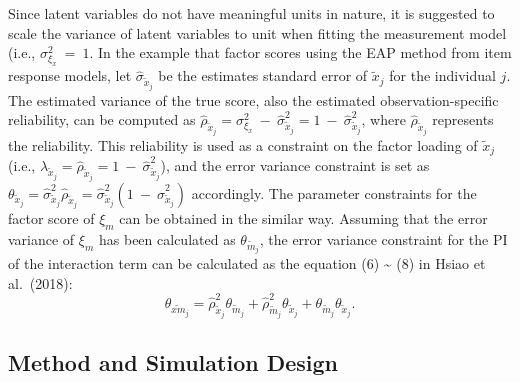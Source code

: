 \documentclass[
  11pt,
  man]{apa6}
\begin{document}
Since latent variables do not have meaningful units in nature, it is suggested to scale the variance of latent variables to unit when fitting the measurement model (i.e., \(\sigma_{\xi_{x}}^2 \ = \ 1\). In the example that factor scores using the EAP method from item response models, let \(\hat{\sigma}_{\tilde{x}_{j}}\) be the estimates standard error of \(\tilde{x}_{j}\) for the individual \(j\). The estimated variance of the true score, also the estimated observation-specific reliability, can be computed as \(\hat{\rho}_{\tilde{x}_{j}} = \sigma_{\xi_{x}}^2 \ - \ \hat{\sigma}_{\tilde{x}_{j}}^2 = 1 \ - \ \hat{\sigma}_{\tilde{x}_{j}}^2\), where \(\hat{\rho}_{\tilde{x}_{j}}\) represents the reliability. This reliability is used as a constraint on the factor loading of \(\tilde{x}_{j}\) (i.e., \(\lambda_{\tilde{x}_{j}} = \hat{\rho}_{\tilde{x}_{j}} = 1 \ - \ \hat{\sigma}_{\tilde{x}_{j}}^2\)), and the error variance constraint is set as \(\theta_{\tilde{x}_{j}} = \hat{\sigma}_{\tilde{x}_{j}}^2\hat{\rho}_{\tilde{x}_{j}} = \hat{\sigma}_{\tilde{x}_{j}}^2(1 \ - \ \hat{\sigma}_{\tilde{x}_{j}}^2)\) accordingly. The parameter constraints for the factor score of \(\xi_{m}\) can be obtained in the similar way. Assuming that the error variance of \(\xi_{m}\) has been calculated as \(\theta_{\tilde{m}_{j}}\), the error variance constraint for the PI of the interaction term can be calculated as the equation (6) \textasciitilde{} (8) in Hsiao et al.~(2018):
\begin{equation}
\theta_{\widetilde{xm}_{j}} =  \hat{\rho}_{\tilde{x}_{j}}^2\theta_{\tilde{m}_{j}} +
                        \hat{\rho}_{\tilde{m}_{j}}^2\theta_{\tilde{x}_{j}} +
                        \theta_{\tilde{m}_{j}}\theta_{\tilde{x}_{j}}. 
\end{equation}

\hypertarget{method-and-simulation-design}{%
\subsection{Method and Simulation Design}\label{method-and-simulation-design}}
\end{document}
